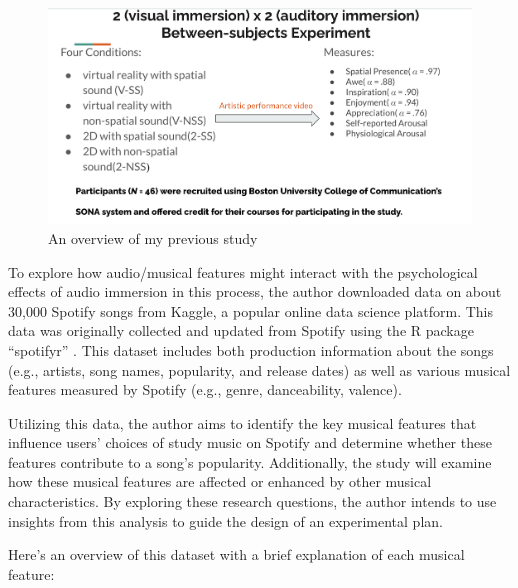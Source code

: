 \documentclass[
]{book}
\begin{document}
\begin{figure}
\centering
\includegraphics{3.png}
\caption{An overview of my previous study}
\end{figure}

To explore how audio/musical features might interact with the psychological effects of audio immersion in this process, the author downloaded data on about 30,000 Spotify songs from Kaggle, a popular online data science platform. This data was originally collected and updated from Spotify using the R package ``spotifyr'' \citep{kaggle30000spotify}. This dataset includes both production information about the songs (e.g., artists, song names, popularity, and release dates) as well as various musical features measured by Spotify (e.g., genre, danceability, valence).

Utilizing this data, the author aims to identify the key musical features that influence users' choices of study music on Spotify and determine whether these features contribute to a song's popularity. Additionally, the study will examine how these musical features are affected or enhanced by other musical characteristics. By exploring these research questions, the author intends to use insights from this analysis to guide the design of an experimental plan.

Here's an overview of this dataset with a brief explanation of each musical feature:
\end{document}
